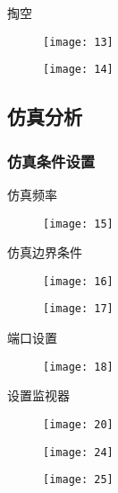 \documentclass{../source/Experiment}
\begin{document}
            掏空
            \begin{figure}[H]
                \centering
                \texttt{[image: 13]}
                \caption{}
            \end{figure}
            \begin{figure}[H]
                \centering
                \texttt{[image: 14]}
                \caption{}
            \end{figure}

        \subsection{仿真分析}

            \subsubsection{仿真条件设置}
            仿真频率
            \begin{figure}[H]
                \centering
                \texttt{[image: 15]}
                \caption{}
            \end{figure}
            仿真边界条件
            \begin{figure}[H]
                \centering
                \texttt{[image: 16]}
                \caption{}
            \end{figure}
            
            \begin{figure}[H]
                \centering
                \texttt{[image: 17]}
                \caption{}
            \end{figure}

            端口设置
            \begin{figure}[H]
                \centering
                \texttt{[image: 18]}
                \caption{}
            \end{figure}
            设置监视器
            
            \begin{figure}[H]
                \centering
                \texttt{[image: 20]}
                \caption{}
            \end{figure}
            \begin{figure}[H]
                \centering
                \texttt{[image: 24]}
                \caption{}
            \end{figure}
            \begin{figure}[H]
                \centering
                \texttt{[image: 25]}
                \caption{}
            \end{figure}
            
\end{document}
